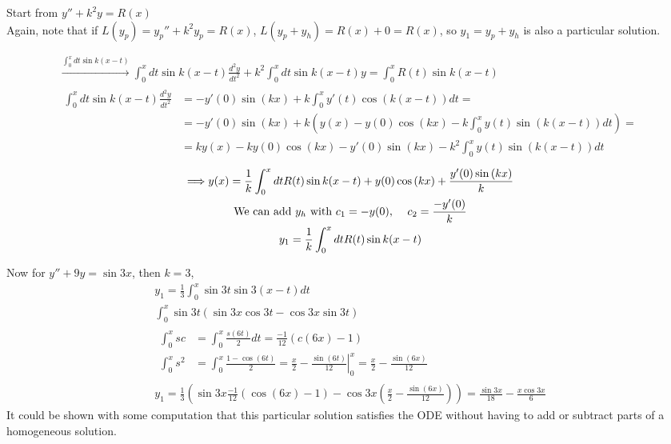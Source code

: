 \documentclass[twoside]{amsart}
\theoremstyle{plain}
\theoremstyle{definition}
\newcommand{\exercisehead}[1]
  {\smallskip
   \noindent{\small\bf Exercise #1.}}
\begin{document}
\exercisehead{19} Start from $y'' + k^2 y = R(x)$ \smallskip \\
Again, note that if $L(y_p) = y_p'' + k^2 y_p = R(x)$, $L(y_p +y_h) = R(x) + 0 = R(x)$, so $y_1 = y_p + y_h$ is also a particular solution.

\[
\begin{gathered}
  \xrightarrow{ \int_0^x dt \sin{ k(x-t)} } \int_0^x dt \sin{k(x-t)} \frac{d^2y}{dt^2} + k^2 \int_0^x dt \sin{ k(x-t)y } = \int_0^x R(t) \sin{ k(x-t) } \\
  \begin{aligned}
    \int_0^x dt \sin{k(x-t)} \frac{d^2y}{dt^2} & = -y'(0) \sin{(kx)}  + k \int_0^x y'(t) \cos{(k(x-t))} dt = \\
    & = -y'(0) \sin{(kx)} + k (y(x) - y(0) \cos{(kx)} - k \int_0^x y(t) \sin{(k(x-t))} dt ) = \\
    & = ky(x) - ky(0) \cos{(kx)} - y'(0) \sin{(kx)} - k^2 \int_0^x y(t) \sin{(k(x-t))} dt 
  \end{aligned} 
\end{gathered}
\]
\[
\begin{gathered}
  \Longrightarrow y(x) = \frac{1}{k} \int_0^x dt R(t) \sin{k(x-t)} + y(0) \cos{(kx)} + \frac{ y'(0) \sin{(kx)} }{k} \\
  \text{ We can add $y_h$ with $c_1 = -y(0)$, \quad $c_2 = \frac{-y'(0)}{k} $ } \\
  y_1 = \frac{1}{k} \int_0^x dt R(t) \sin{k(x-t) }
\end{gathered}
\]

Now for $y'' + 9y = \sin{3x}$, then $k=3$, 
\[
\begin{gathered}
  y_1 = \frac{1}{3} \int_0^x \sin{3t} \sin{3(x-t)} dt \\
  \int_0^x \sin{3t} (\sin{3x} \cos{3t} - \cos{3x} \sin{3t} ) \\
  \begin{aligned}
    \int_0^x sc & = \int_0^x \frac{s(6t)}{2} dt  = \frac{-1}{12} (c(6x) - 1 ) \\
    \int_0^x s^2 & = \int_0^x \frac{ 1 - \cos{(6t)}}{2} = \left. \frac{x}{2} - \frac{ \sin{ (6t) }}{12} \right|_0^x = \frac{x}{2} - \frac{ \sin{(6x)}}{12 } 
  \end{aligned} \\
  y_1 = \frac{1}{3} \left( \sin{3x} \frac{-1}{12} (\cos{(6x)} - 1 ) - \cos{3x} \left( \frac{x}{2} - \frac{\sin{(6x)}}{12} \right) \right) = \boxed{ \frac{\sin{3x}}{18}  - \frac{ x \cos{3x} }{6}  }
\end{gathered}
\]
It could be shown with some computation that this particular solution satisfies the ODE without having to add or subtract parts of a homogeneous solution.  
\end{document}

